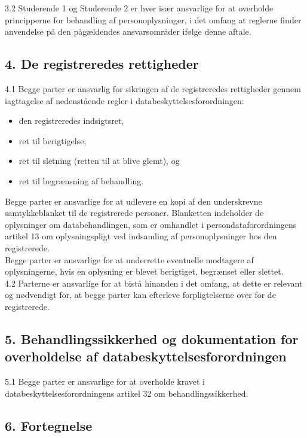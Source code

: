 \documentclass[11pt, a4paper]{article}
\begin{document}
3.2 Studerende 1 og Studerende 2 er hver især ansvarlige for at overholde principperne for behandling af personoplysninger, i det omfang at reglerne finder anvendelse på den pågældendes ansvarsområder ifølge denne aftale.


\subsection*{4. De registreredes rettigheder}

4.1 Begge parter er ansvarlig for sikringen af de registreredes rettigheder gennem iagttagelse af nedenstående regler i databeskyttelsesforordningen:
\begin{itemize}
	\item den registreredes indsigtsret,
	\item ret til berigtigelse,
	\item ret til sletning (retten til at blive glemt), og
	\item ret til begrænsning af behandling.
\end{itemize}

Begge parter er ansvarlige for at udlevere en kopi af den underskrevne samtykkeblanket til de registrerede personer. Blanketten indeholder de oplysninger om databehandlingen, som er omhandlet i persondataforordningens artikel 13 om oplysningspligt ved indsamling af personoplysninger hos den registrerede.\\

Begge parter er ansvarlige for at underrette eventuelle modtagere af oplysningerne, hvis en oplysning er blevet berigtiget, begrænset eller slettet.\\

4.2 Parterne er ansvarlige for at bistå hinanden i det omfang, at dette er relevant og nødvendigt for, at begge parter kan efterleve forpligtelserne over for de registrerede.

\subsection*{5. Behandlingssikkerhed og dokumentation for overholdelse af databeskyttelsesforordningen}

5.1 Begge parter er ansvarlige for at overholde kravet i databeskyttelsesforordningens artikel 32 om behandlingssikkerhed.

\subsection*{6. Fortegnelse}
\end{document}
